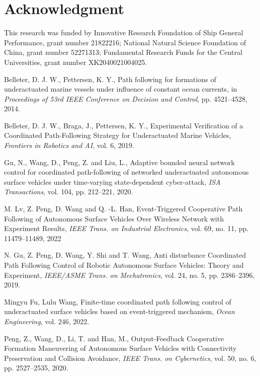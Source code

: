 \documentclass[conference,letterpaper,10.5pt]{IEEEtran}
\begin{document}
\section*{Acknowledgment}
This research was funded by Innovative Research Foundation of Ship General Performance, grant number 21822216; National Natural Science Foundation of China, grant number 52271313; Fundamental Research Funds for the Central Universities, grant number XK2040021004025.

\begin{thebibliography}{0}
	
	 Belleter, D. J. W., Pettersen, K. Y., Path following for formations of underactuated marine vessels under influence of constant ocean currents, in \emph{Proceedings of 53rd IEEE Conference on Decision and Control}, pp. 4521--4528, 2014.
	
	 Belleter, D. J. W., Braga, J., Pettersen, K. Y., Experimental Verification of a Coordinated Path-Following Strategy for Underactuated Marine Vehicles, \emph{Frontiers in Robotics and AI}, vol. 6, 2019.
	
	 Gu, N., Wang, D., Peng, Z. and Liu, L., Adaptive bounded neural network control for coordinated path-following of networked underactuated autonomous surface vehicles under time-varying state-dependent cyber-attack, \emph{ISA Transactions}, vol. 104, pp. 212--221, 2020.
	
	 M. Lv, Z. Peng, D. Wang and Q. -L. Han, Event-Triggered Cooperative Path Following of Autonomous Surface Vehicles Over Wireless Network with Experiment Results, \emph{IEEE Trans. on Industrial Electronics}, vol. 69, no. 11, pp. 11479--11489, 2022
	
	 N. Gu, Z. Peng, D. Wang, Y. Shi and T. Wang, Anti disturbance Coordinated Path Following Control of Robotic Autonomous Surface Vehicles: Theory and Experiment, \emph{IEEE/ASME Trans. on Mechatronics}, vol. 24, no. 5, pp. 2386--2396, 2019.
	
	 Mingyu Fu, Lulu Wang, Finite-time coordinated path following control of underactuated surface vehicles based on event-triggered mechanism, \emph{Ocean Engineering}, vol. 246, 2022.
	
	 Peng, Z., Wang, D., Li, T. and Han, M., Output-Feedback Cooperative Formation Maneuvering of Autonomous Surface Vehicles with Connectivity Preservation and Collision Avoidance, \emph{IEEE Trans. on Cybernetics}, vol. 50, no. 6, pp. 2527--2535, 2020.
	

\end{thebibliography}
\end{document}
